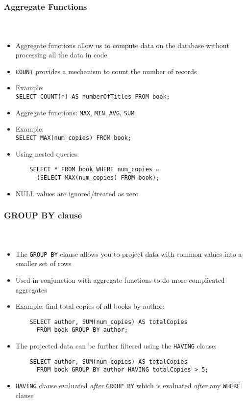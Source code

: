 \documentclass{beamer}
\begin{document}
\begin{frame}[fragile]
  \frametitle{Aggregate Functions}
  \framesubtitle{~}

\begin{itemize}
  \item Aggregate functions allow us to compute data on the database without processing all the data in code
  \item \texttt{COUNT} provides a mechanism to count the number of records
  \item Example:\\
	\texttt{SELECT COUNT(*) AS numberOfTitles FROM book;}
  \item Aggregate functions: \texttt{MAX}, \texttt{MIN}, \texttt{AVG}, \texttt{SUM}
  \item Example:\\
	\texttt{SELECT MAX(num_copies) FROM book;}
  \item Using nested queries: \\
  	\begin{verbatim}
	SELECT * FROM book WHERE num_copies = 
	  (SELECT MAX(num_copies) FROM book);
	\end{verbatim}
  \item NULL values are ignored/treated as zero
\end{itemize}

\end{frame}

\begin{frame}[fragile]
  \frametitle{GROUP BY clause}
  \framesubtitle{~}

\begin{itemize}
  \item The \texttt{GROUP BY} clause allows you to project data with common values into a smaller set of rows
  \item Used in conjunction with aggregate functions to do more complicated aggregates
  \item Example: find total copies of all books by author:\\
	\begin{verbatim}
	SELECT author, SUM(num_copies) AS totalCopies 
	  FROM book GROUP BY author;
	\end{verbatim}
  \item The projected data can be further filtered using the \texttt{HAVING} clause:
	\begin{verbatim}
	SELECT author, SUM(num_copies) AS totalCopies 
	  FROM book GROUP BY author HAVING totalCopies > 5;
	\end{verbatim}
  \item \texttt{HAVING} clause evaluated \emph{after} \texttt{GROUP BY} which is evaluated \emph{after} any \texttt{WHERE} clause
\end{itemize}

\end{frame}
\end{document}

